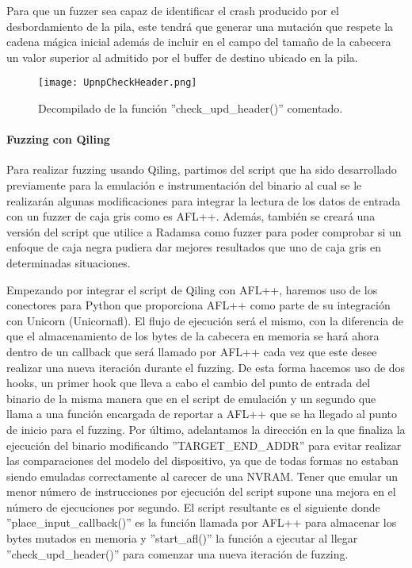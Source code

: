 Para que un fuzzer sea capaz de identificar el crash producido por el desbordamiento de la pila, este tendrá que generar una mutación que respete la 
cadena mágica inicial además de incluir en el campo del tamaño de la cabecera un valor superior al admitido por el buffer de destino ubicado en la pila.

\begin{figure}[H]
    \centering
    \texttt{[image: UpnpCheckHeader.png]}
    \caption{Decompilado de la función ''check\_upd\_header()'' comentado.}
    \label{fig:UpnpCheckHeader}
\end{figure}

\paragraph{Fuzzing con Qiling}
Para realizar fuzzing usando Qiling, partimos del script que ha sido desarrollado previamente para la emulación e instrumentación del binario al
cual se le realizarán algunas modificaciones para integrar la lectura de los datos de entrada con un fuzzer de caja gris como es AFL++\cite{afl++}. Además, también se 
creará una versión del script que utilice a Radamsa\cite{radamsa} como fuzzer para poder comprobar si un enfoque de caja negra
pudiera dar mejores resultados que uno de caja gris en determinadas situaciones.\bigskip

Empezando por integrar el script de Qiling con AFL++, haremos uso de los conectores para Python que proporciona AFL++ como parte de su integración
con Unicorn (Unicornafl). El flujo de ejecución será el mismo, con la diferencia de que el almacenamiento de los bytes de la cabecera en memoria se hará ahora 
dentro de un callback que será llamado por AFL++ cada vez que este desee realizar una nueva iteración durante el fuzzing. De esta forma hacemos
uso de dos hooks, un primer hook que lleva a cabo el cambio del punto de entrada del binario de la misma manera que en el script de emulación y un 
segundo que llama a una función encargada de reportar a AFL++ que se ha llegado al punto de inicio para el fuzzing. Por último, adelantamos la 
dirección en la que finaliza la ejecución del binario modificando ''TARGET\_END\_ADDR'' para evitar realizar las comparaciones del modelo del 
dispositivo, ya que de todas formas no estaban siendo emuladas correctamente al carecer de una NVRAM. Tener que emular un menor número de 
instrucciones por ejecución del script supone una mejora en el número de ejecuciones por segundo. El script resultante es el siguiente donde 
''place\_input\_callback()'' es la función llamada por AFL++ para almacenar los bytes mutados en memoria y ''start\_afl()'' la función a ejecutar 
al llegar ''check\_upd\_header()'' para comenzar una nueva iteración de fuzzing.

